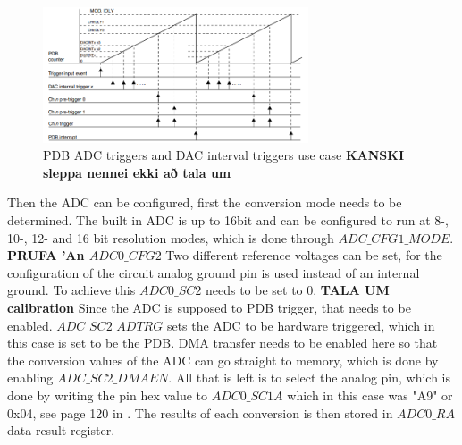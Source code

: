 \begin{figure}[h]
    \centering
    \includegraphics[width=0.70\textwidth]{graphics/PDBtrigger.png}
    \caption{PDB ADC triggers and DAC interval triggers use case \textbf{KANSKI sleppa nennei ekki að tala um}\cite{freescale_semiconductor_kinetis_2021}}
    \label{fig:PDBTrigger}
\end{figure}

Then the ADC can be configured, first the conversion mode needs to be determined.
The built in ADC is up to 16bit and can be configured to run at 8-, 10-, 12- and 16 bit resolution modes, which is done through $ADC\_CFG1\_MODE$.
\textbf{PRUFA 'An $ADC0\_CFG2$}
Two different reference voltages can be set, for the configuration of the circuit analog ground pin is used instead of an internal ground.
To achieve this $ADC0\_SC2$ needs to be set to 0.
\textbf{TALA UM calibration}
Since the ADC is supposed to PDB trigger, that needs to be enabled.
$ADC\_SC2\_ADTRG$ sets the ADC to be hardware triggered, which in this case is set to be the PDB.
DMA transfer needs to be enabled here so that the conversion values of the ADC can go straight to memory, which is done by enabling  $ADC\_SC2\_DMAEN$.
All that is left is to select the analog pin, which is done by writing the pin hex value to $ADC0\_SC1A$ which in this case was "A9" or 0x04, see page 120 in \cite{freescale_semiconductor_kinetis_2021}.
The results of each conversion is then stored in $ADC0\_RA$ data result register.

